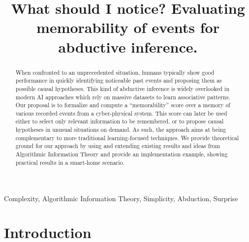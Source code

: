 \documentclass[conference]{IEEEtran}
\begin{document}
\title{
  What should I notice? Evaluating memorability of events for abductive inference.
}
\author{

}

\maketitle

\begin{abstract}
  When confronted to an unprecedented situation, humans typically show good
  performance in quickly identifying noticeable past events and proposing them
  as possible causal hypotheses. This kind of abductive inference is widely
  overlooked in modern AI approaches which rely on massive datasets to learn
  associative patterns. Our proposal is to formalize and compute a ``memorability''
  score over a memory of various recorded events from a cyber-physical system.
  This score can later be used either to select only relevant information to be
  remembered, or to propose causal hypotheses in unusual situations on demand.
  As such, the approach aims at being complementary to more traditional
  learning-focused techniques. We provide theoretical ground for our approach by
  using and extending existing results and ideas from Algorithmic Information
  Theory and provide an implementation example, showing practical results in a
  smart-home scenario.
\end{abstract}

\begin{IEEEkeywords}
  Complexity, Algorithmic Information Theory, Simplicity, Abduction, Surprise
\end{IEEEkeywords}

\section{Introduction}

\end{document}
